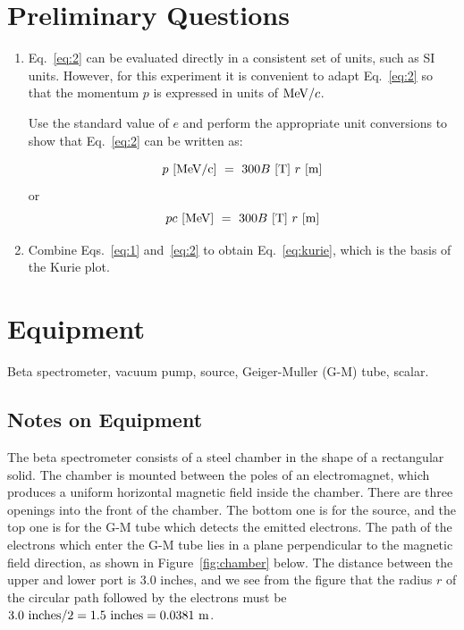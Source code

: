 \section{Preliminary Questions}
\begin{enumerate}
\item Eq.~\ref{eq:2} can be evaluated directly in a consistent set of units,
such as SI units.  However, for this experiment it is convenient to
adapt Eq.~\ref{eq:2} so that the momentum $p$ is expressed in units of ${\rm MeV}/c$.

Use the standard value of $e$ and perform the appropriate unit conversions to
show that Eq.~\ref{eq:2} can be written as:

\begin{equation}
p~{\rm [MeV/c]} ~=~ 300 B~{\rm [T]}~r~{\rm [m]}
\end{equation}
or
\begin{equation}
pc~{\rm [MeV]} ~=~ 300 B~{\rm [T]}~r~{\rm [m]}
\end{equation}

\item Combine Eqs.~\ref{eq:1} and~\ref{eq:2} to obtain Eq.~\ref{eq:kurie}, which
  is the basis of the Kurie plot.

\end{enumerate}


\section{Equipment}
Beta spectrometer, vacuum pump, \cs source, Geiger-Muller
(G-M) tube, scalar.

\subsection{Notes on Equipment}

The beta spectrometer consists of a steel chamber in the shape of a
rectangular solid.  The chamber is mounted between the poles of an
electromagnet, which produces a uniform horizontal magnetic field
inside the chamber.  There are three openings into the front of the
chamber. The bottom one is for the \cs source, and the top one is
for the G-M tube which detects the emitted electrons.  The path of the
electrons which enter the G-M tube lies in a plane perpendicular to the
magnetic field direction, as shown in Figure~\ref{fig:chamber} below.  The distance
between the upper and lower port is 3.0 inches, and we see from the
figure that the radius $r$ of the circular path followed by the electrons
must be $3.0~{\rm inches}/2 = 1.5~{\rm inches} =  0.0381~{\rm m}$.

